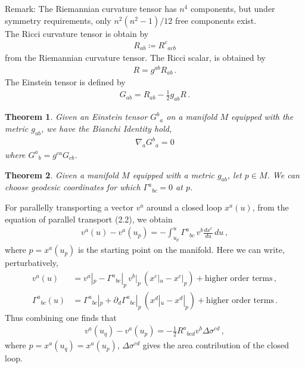 \documentclass[11pt, onesided]{book}
\theoremstyle{break}
\theoremstyle{break}
\newtheorem{thm}{Theorem}[section]
\newcommand{\pd}{\partial}
\newcommand{\remark}{\color{blue}Remark: \color{black}}
\begin{document}
\remark The Riemannian curvature tensor has $n^4$ components, but under symmetry requirements, only $n^2(n^2 - 1)/12$ free components exist. \\

The Ricci curvature tensor is obtain by
\begin{align*}
R_{ab} \coloneqq R^c{}_{acb}
\end{align*}
from the Riemannian curvature tensor. The Ricci scalar, is obtained by
\begin{align*}
R = g^{ab}R_{ab}\,.
\end{align*}
The Einstein tensor is defined by
\begin{align*}
G_{ab} = R_{ab} - \frac{1}{2}g_{ab} R\,.
\end{align*}
\begin{thm}
Given an Einstein tensor $G^b{}_a$ on a manifold $M$ equipped with the metric $g_{ab}$, we have the Bianchi Identity hold,
\begin{align*}
\nabla_a G^b{}_a = 0
\end{align*}
where $G^a{}_b = g^{ca}G_{cb}$. 
\end{thm}
\begin{thm}
Given a manifold $M$ equipped with a metric $g_{ab}$, let $p \in M$. We can choose geodesic coordinates for which $\Gamma^a{}_{bc} = 0$ at $p$. 
\end{thm}

For parallelly transporting a vector $v^a$ around a closed loop $x^a(u)$, from the equation of parallel transport (2.2), we obtain
\begin{align*}
v^a(u) - v^a(u_p) = -\int_{u_p}^{u} \Gamma^a{}_{bc} \, v^b \frac{dx^c}{du}\, du\,,
\end{align*}
where $p = x^a(u_p)$ is the starting point on the manifold. Here we can write, perturbatively, 
\begin{align*}
v^a(u) &= v^a|_p - \Gamma^a{}_{bc}|_p \, v^b|_p \, (x^c|_u - x^c|_p) + \text{higher order terms}\,,\\
\Gamma^a{}_{bc}(u) &= \Gamma^a{}_{bc}|_p + \pd_d \Gamma^a{}_{bc}|_p \, (x^d|_u - x^d|_p) + \text{higher order terms}\,.
\end{align*}
Thus combining one finds that
\begin{align*}
v^a(u_q) - v^a(u_p) = -\frac{1}{2}R^a{}_{bcd}v^b \Delta \sigma^{cd}\,,
\end{align*}
where $p = x^a(u_q) = x^a(u_p)$, $\Delta \sigma^{cd}$ gives the area contribution of the closed loop. \\
\end{document}

